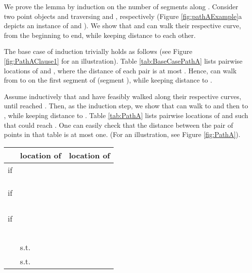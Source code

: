 \documentclass[12pt]{dalthesis}
\def\favoritefont{\bfseries \sffamily}
\def\QED{\ensuremath{{\Box}}}
\def\markatright#1{\leavevmode\unskip\nobreak\quad\hspace*{\fill}{#1}}
\newenvironment{proof}
	{\begin{trivlist}\item[\hskip\labelsep{\favoritefont Proof:}]}
	{\markatright{\QED}\end{trivlist}}
\begin{document}
\begin{proof}

We prove the lemma by induction on the number of segments along . 
Consider two point objects  and  
traversing  and , respectively (Figure \ref{fig:pathAExample}a depicts an instance of  and ).
We show that  and  can walk
their respective curve, from the beginning to
 end, while keeping distance  to each other. 

The base case of induction trivially holds as follows 
(see Figure \ref{fig:PathAClause1} for an illustration).
Table \ref{tab:BaseCasePathA} lists  pairwise locations of 
 and , where the distance of each pair is at most .
Hence,  can walk from  to  on the 
first segment of  (segment ), 
while keeping distance  to .


Assume inductively that  and  have feasibly walked along 
their respective curves, until  reached .
Then, as the induction step, 
we 
show that
 can walk to  and then to , while keeping distance  to .
Table \ref{tab:PathA} lists pairwise locations
of  and  such that  could reach  .
One can easily check that the distance between the pair of points 
in that table is at most one.
 (For an illustration, see Figure \ref{fig:PathA}). 


\begin{table}[t]
\centering
\begin{tabular}{ r | l | l  }
  & location of  & location of   
 \\
\hline
   if   &  & \\
	&  & \\ 
	&  & \\ 

	&  &  \\





   if   &  &  \\
	&  &\\
	&  &\\
	& &\\
	&  &\\




   if   &  & \\
	&  & \\
	&  & \\

	& &\\
	& &\\
&  &  \\

\hline
	&   s.t.   & \\
	&  	 s.t.   & \\






\end{tabular}
\end{table}
\end{proof}
\end{document}
